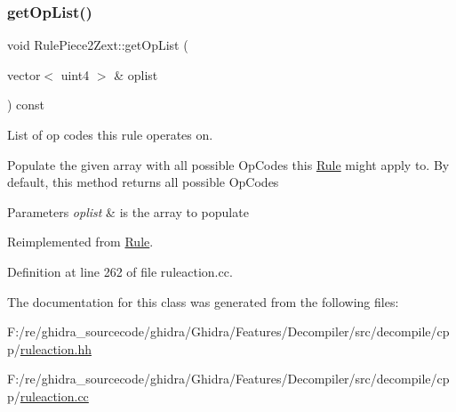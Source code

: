 \subsubsection{\texorpdfstring{getOpList()}{getOpList()}}
{\footnotesize\ttfamily void Rule\+Piece2\+Zext\+::get\+Op\+List (\begin{DoxyParamCaption}\item[{vector$<$ uint4 $>$ \&}]{oplist }\end{DoxyParamCaption}) const\hspace{0.3cm}{\ttfamily [virtual]}}



List of op codes this rule operates on. 

Populate the given array with all possible Op\+Codes this \mbox{\hyperlink{class_rule}{Rule}} might apply to. By default, this method returns all possible Op\+Codes 
\begin{DoxyParams}{Parameters}
{\em oplist} & is the array to populate \\
\hline
\end{DoxyParams}


Reimplemented from \mbox{\hyperlink{class_rule_a4023bfc7825de0ab866790551856d10e}{Rule}}.



Definition at line 262 of file ruleaction.\+cc.



The documentation for this class was generated from the following files\+:\begin{DoxyCompactItemize}
\item 
F\+:/re/ghidra\+\_\+sourcecode/ghidra/\+Ghidra/\+Features/\+Decompiler/src/decompile/cpp/\mbox{\hyperlink{ruleaction_8hh}{ruleaction.\+hh}}\item 
F\+:/re/ghidra\+\_\+sourcecode/ghidra/\+Ghidra/\+Features/\+Decompiler/src/decompile/cpp/\mbox{\hyperlink{ruleaction_8cc}{ruleaction.\+cc}}\end{DoxyCompactItemize}
